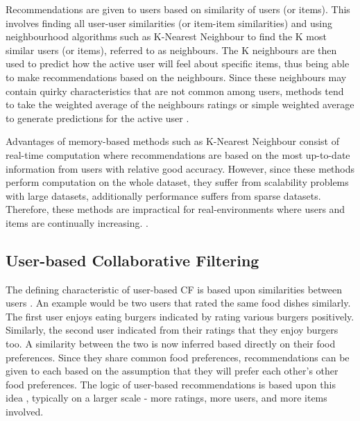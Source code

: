 Recommendations are given to users based on similarity of users (or items). This involves finding all user-user similarities (or item-item similarities) and using neighbourhood algorithms such as K-Nearest Neighbour to find the K most similar users (or items), referred to as neighbours. The K neighbours are then used to predict how the active user will feel about specific items, thus being able to make recommendations based on the neighbours. Since these neighbours may contain quirky characteristics that are not common among users, methods tend to take the weighted average of the neighbours ratings or simple weighted average to generate predictions for the active user \cite{survey}. 

Advantages of memory-based methods such as K-Nearest Neighbour consist of real-time computation where recommendations are based on the most up-to-date information from users with relative good accuracy. However, since these methods perform computation on the whole dataset, they suffer from scalability problems with large datasets, additionally performance suffers from sparse datasets. Therefore, these methods are impractical for real-environments where users and items are continually increasing.  \cite{zeng2003similarity}. 




\subsection{User-based Collaborative Filtering}

The defining characteristic of user-based CF is based upon similarities between users \cite{mahoutaction}. An example would be two users that rated the same food dishes similarly. The first user enjoys eating burgers indicated by rating various burgers positively. Similarly, the second user indicated from their ratings that they enjoy burgers too. A similarity between the two is now inferred based directly on their food preferences. Since they share common food preferences, recommendations can be given to each based on the assumption that they will prefer each other's other food preferences. The logic of user-based recommendations is based upon this idea \cite{mahoutaction}, typically on a larger scale - more ratings, more users, and more items involved. 

